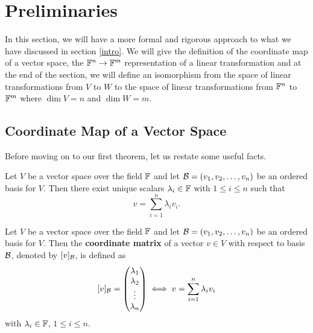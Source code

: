 \section{Preliminaries} \label{section2}

In this section, we will have a more formal and rigorous approach to
what we have discussed in section \ref{intro}. We will give the definition of
the coordinate map of a vector space, the $\mathbb{F}^{n} \to \mathbb{F}^{m}$
representation of a linear transformation and at the end of the section,
we will define an isomorphism from the space of linear transformations
from $V$ to $W$ to the space of linear transformations from
$\mathbb{F}^{n}$ to $\mathbb{F}^{m}$ where $\dim{V} = n$ and $\dim{W} = m$.

\subsection{Coordinate Map of a Vector Space}

Before moving on to our first theorem, let us restate some useful facts.

\begin{remark}
    Let $V$ be a vector space over the field $\mathbb{F}$ and let
    $\mathcal{B} = (v_{1}, v_{2}, \dots, v_{n})$ be an ordered basis for $V$. Then
    there exist unique scalars $\lambda_{i} \in \mathbb{F}$ with $1 \leq i \leq n$
    such that
    \[
        v = \sum_{i=1}^{n} \lambda_{i} v_{i}.    
    \]
\end{remark}


\begin{remark}
    Let $V$ be a vector space over the field $\mathbb{F}$ and let
    $\mathcal{B} = (v_{1}, v_{2}, \dots, v_{n})$ be an ordered basis for $V$. Then
    the \textbf{coordinate matrix} of a vector $v \in V$ with respect to
    basis $\mathcal{B}$, denoted by $[v]_{\mathcal{B}}$, is defined as
    \[
        [v]_{\mathcal{B}} = \begin{pmatrix}
                            \lambda_{1} \\
                            \lambda_{2} \\
                            \vdots \\
                            \lambda_{n}
                        \end{pmatrix}        
        \iff
        v = \sum_{i=1}^{n} \lambda_{i} v_{i}
    \]
    with $\lambda_{i} \in \mathbb{F}$, $1 \leq i \leq n$.
\end{remark}


